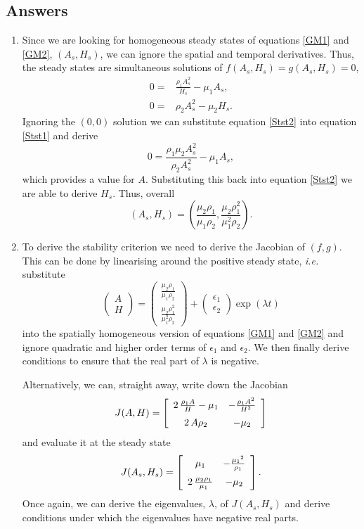 \documentclass[10pt]{article}
\newcommand{\bb}{\begin{equation}}
\newcommand{\ee}{\end{equation}}
\newcommand{\eqn}[1]{equation \eqref{#1}}
\newcommand{\eqns}[2]{equations \eqref{#1} and \eqref{#2}}
\newcommand{\ie}{\emph{i.e.} }
\renewcommand{\l}{\left(}
\renewcommand{\r}{\right)}
\begin{document}
\begin{Answ}
\subsection{Answers}
\begin{enumerate}
\item Since we are looking for homogeneous steady states of \eqns{GM1}{GM2}, $(A_s,H_s)$, we can ignore the spatial and temporal derivatives. Thus, the steady states are simultaneous solutions of $f(A_s,H_s)=g(A_s,H_s)=0$,
\begin{align}
0=&\frac{\rho_1 A_s^2}{ H_s}-\mu_1 A_s,\label{Stst1}\\
0=&\rho_2 A_s^2-\mu_2 H_s.\label{Stst2}
\end{align}
Ignoring the $(0,0)$ solution we can substitute \eqn{Stst2} into \eqn{Stst1} and derive
\bb
0=\frac{\rho_1\mu_2 A_s^2}{ \rho_2 A_s^2}-\mu_1 A_s,
\ee
which provides a value for $A$. Substituting this back into \eqn{Stst2} we are able to derive $H_s$. Thus, overall
\bb
(A_s,H_s)= \l \frac{\mu_2\rho_1}{\mu_1\rho_2}, \frac{\mu_2\rho_1^2}{\mu_1^2\rho_2}\r.
\ee


\item To derive the stability criterion we need to derive the Jacobian of $(f,g)$. This can be done by linearising around the positive steady state, \ie substitute
\bb
\l\begin {array}{c} A \\ H\end {array} \r=\l\begin {array}{c} \frac{\mu_2\rho_1}{\mu_1\rho_2} \\ \frac{\mu_2\rho_1^2}{\mu_1^2\rho_2} \end {array} \r+\l\begin {array}{c} \epsilon_1 \\ \epsilon_2\end {array} \r\exp(\lambda t)
\ee
into the spatially homogeneous version of \eqns{GM1}{GM2} and ignore quadratic and higher order terms of $\epsilon_1$ and $\epsilon_2$. We then finally derive conditions to ensure that  the real part of $\lambda$ is negative.

Alternatively, we can, straight away, write down the Jacobian
\bb
J(A,H)= \left[ \begin {array}{cc} 2\,{\frac {\rho_{{1}}A}{H}}-\mu_{{1}}&-{
\frac {\rho_{{1}}{A}^{2}}{{H}^{2}}}\\ \noalign{\medskip}2\,A\rho_{{2}}
&-\mu_{{2}}\end {array} \right] 
\ee
and evaluate it at the steady state
\bb
J(A_s,H_s)=  \left[ \begin {array}{cc} \mu_{{1}}&-{\frac {{\mu_{{1}}}^{2}}{\rho_{{
1}}}}\\ \noalign{\medskip}2\,{\frac {\mu_{{2}}\rho_{{1}}}{\mu_{{1}}}}&
-\mu_{{2}}\end {array} \right].
\ee
Once again, we can derive the eigenvalues, $\lambda$, of $J(A_s,H_s)$ and derive conditions under which the eigenvalues have negative real parts.


\end{enumerate}
\end{Answ}
\end{document}
